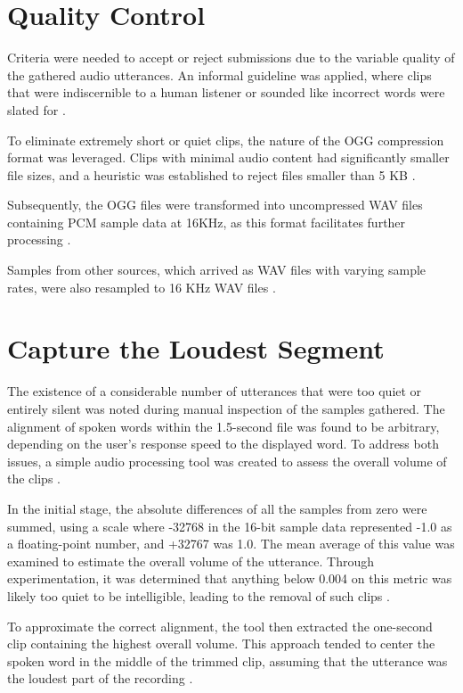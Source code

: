 \section{Quality Control}
\label{section:QC}

Criteria were needed to accept or reject submissions due to the variable quality of the gathered audio utterances. An informal guideline was applied, where clips that were indiscernible to a human listener or sounded like incorrect words were slated for \cite{Warden:2018}.

To eliminate extremely short or quiet clips, the nature of the OGG compression format was leveraged. Clips with minimal audio content had significantly smaller file sizes, and a heuristic was established to reject files smaller than 5 KB \cite{Warden:2018}.

Subsequently, the OGG files were transformed into uncompressed WAV files containing PCM sample data at 16KHz, as this format facilitates further processing \cite{Warden:2018}.

Samples from other sources, which arrived as WAV files with varying sample rates, were also resampled to 16 KHz WAV files \cite{Warden:2018}.


\section{Capture the Loudest Segment}
\label{section:CaptureLoudest}

The existence of a considerable number of utterances that were too quiet or entirely silent was noted during manual inspection of the samples gathered. The alignment of spoken words within the 1.5-second file was found to be arbitrary, depending on the user's response speed to the displayed word. To address both issues, a simple audio processing tool was created to assess the overall volume of the clips \cite{Warden:2018}.

In the initial stage, the absolute differences of all the samples from zero were summed, using a scale where -32768 in the 16-bit sample data represented -1.0 as a floating-point number, and +32767 was 1.0. The mean average of this value was examined to estimate the overall volume of the utterance. Through experimentation, it was determined that anything below 0.004 on this metric was likely too quiet to be intelligible, leading to the removal of such clips \cite{Warden:2018}.

To approximate the correct alignment, the tool then extracted the one-second clip containing the highest overall volume. This approach tended to center the spoken word in the middle of the trimmed clip, assuming that the utterance was the loudest part of the recording \cite{Warden:2018}.

